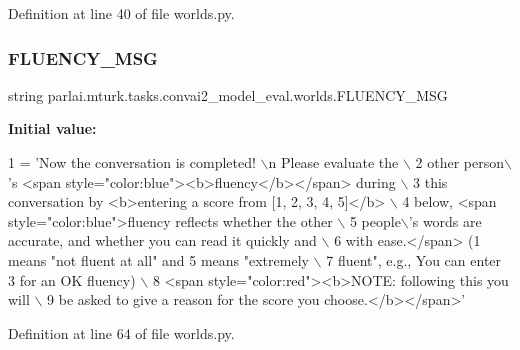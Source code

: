 Definition at line 40 of file worlds.\+py.

\mbox{\label{namespaceparlai_1_1mturk_1_1tasks_1_1convai2__model__eval_1_1worlds_ac4f200cc40b0955e7c8dd5cfdc48dcea}} 
\subsubsection{\texorpdfstring{F\+L\+U\+E\+N\+C\+Y\+\_\+\+M\+SG}{FLUENCY\_MSG}}
{\footnotesize\ttfamily string parlai.\+mturk.\+tasks.\+convai2\+\_\+model\+\_\+eval.\+worlds.\+F\+L\+U\+E\+N\+C\+Y\+\_\+\+M\+SG}

{\bfseries Initial value\+:}
\begin{DoxyCode}
1 =  \textcolor{stringliteral}{'Now the conversation is completed! \(\backslash\)n Please evaluate the \(\backslash\)}
2 \textcolor{stringliteral}{        other person\(\backslash\)'s <span style="color:blue"><b>fluency</b></span> during \(\backslash\)}
3 \textcolor{stringliteral}{        this conversation by <b>entering a score from [1, 2, 3, 4, 5]</b> \(\backslash\)}
4 \textcolor{stringliteral}{        below, <span style="color:blue">fluency reflects whether the other \(\backslash\)}
5 \textcolor{stringliteral}{        people\(\backslash\)'s words are accurate, and whether you can read it quickly and \(\backslash\)}
6 \textcolor{stringliteral}{        with ease.</span> (1 means "not fluent at all" and 5 means "extremely \(\backslash\)}
7 \textcolor{stringliteral}{        fluent", e.g., You can enter 3 for an OK fluency) \(\backslash\)}
8 \textcolor{stringliteral}{        <span style="color:red"><b>NOTE: following this you will \(\backslash\)}
9 \textcolor{stringliteral}{        be asked to give a reason for the score you choose.</b></span>'}
\end{DoxyCode}


Definition at line 64 of file worlds.\+py.

\mbox{\label{namespaceparlai_1_1mturk_1_1tasks_1_1convai2__model__eval_1_1worlds_a25fa5856bdd1869ec38af102e07d63b8}} 
